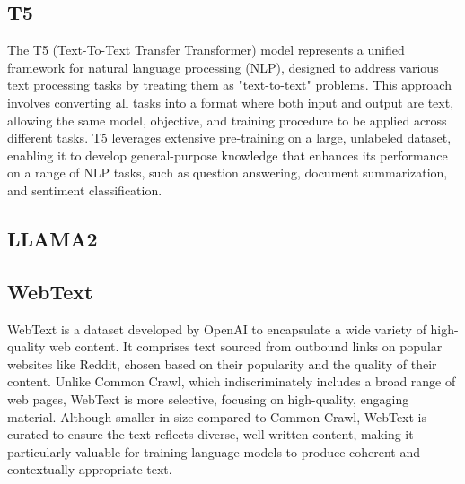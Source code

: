 \subsection{T5}
The T5 (Text-To-Text Transfer Transformer) model represents a unified framework for natural language processing (NLP), designed to address various text processing tasks by treating them as "text-to-text" problems. This approach involves converting all tasks into a format where both input and output are text, allowing the same model, objective, and training procedure to be applied across different tasks. T5 leverages extensive pre-training on a large, unlabeled dataset, enabling it to develop general-purpose knowledge that enhances its performance on a range of NLP tasks, such as question answering, document summarization, and sentiment classification\cite{raffel2023exploring}.
\subsection{LLAMA2}
\subsection{WebText }
WebText is a dataset developed by OpenAI to encapsulate a wide variety of high-quality web content. It comprises text sourced from outbound links on popular websites like Reddit, chosen based on their popularity and the quality of their content. Unlike Common Crawl, which indiscriminately includes a broad range of web pages, WebText is more selective, focusing on high-quality, engaging material. Although smaller in size compared to Common Crawl, WebText is curated to ensure the text reflects diverse, well-written content, making it particularly valuable for training language models to produce coherent and contextually appropriate text\cite{radford2019language}.
